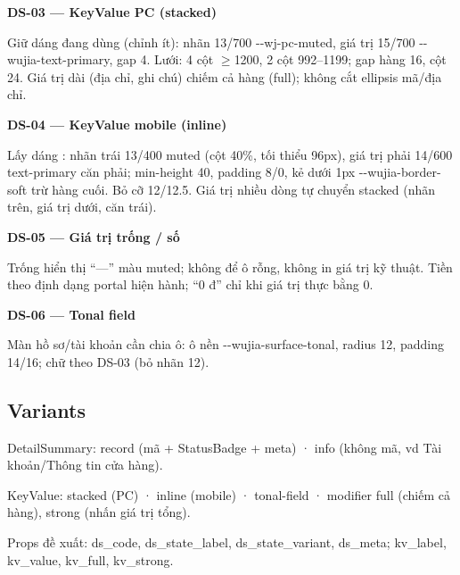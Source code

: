 \documentclass[11pt,a4paper]{report}
\begin{document}
\par\smallskip\textbf{DS-03 — KeyValue PC (stacked)}\par
Giữ dáng  đang dùng (chỉnh ít): nhãn 13/\allowbreak{}700 -\kern0pt-\allowbreak{}wj-\allowbreak{}pc-\allowbreak{}muted, giá trị 15/\allowbreak{}700 -\kern0pt-\allowbreak{}wujia-\allowbreak{}text-\allowbreak{}primary, gap 4. Lưới: 4 cột \(\geq\)1200, 2 cột 992–1199; gap hàng 16, cột 24. Giá trị dài (địa chỉ, ghi chú) chiếm cả hàng (full); không cắt ellipsis mã/\allowbreak{}địa chỉ.\par

\par\smallskip\textbf{DS-04 — KeyValue mobile (inline)}\par
Lấy dáng : nhãn trái 13/\allowbreak{}400 muted (cột 40\%, tối thiểu 96px), giá trị phải 14/\allowbreak{}600 text-\allowbreak{}primary căn phải; min-\allowbreak{}height 40, padding 8/\allowbreak{}0, kẻ dưới 1px -\kern0pt-\allowbreak{}wujia-\allowbreak{}border-\allowbreak{}soft trừ hàng cuối. Bỏ cỡ 12/\allowbreak{}12.5. Giá trị nhiều dòng tự chuyển stacked (nhãn trên, giá trị dưới, căn trái).\par

\par\smallskip\textbf{DS-05 — Giá trị trống / số}\par
Trống hiển thị “—” màu muted; không để ô rỗng, không in giá trị kỹ thuật. Tiền theo định dạng portal hiện hành; “0 đ” chỉ khi giá trị thực bằng 0.\par

\par\smallskip\textbf{DS-06 — Tonal field}\par
Màn hồ sơ/\allowbreak{}tài khoản cần chia ô: ô nền -\kern0pt-\allowbreak{}wujia-\allowbreak{}surface-\allowbreak{}tonal, radius 12, padding 14/\allowbreak{}16; chữ theo DS-03 (bỏ nhãn 12).\par
\subsection*{Variants}
DetailSummary: record (mã + StatusBadge + meta) · info (không mã, vd Tài khoản/\allowbreak{}Thông tin cửa hàng).\par
KeyValue: stacked (PC) · inline (mobile) · tonal-\allowbreak{}field · modifier full (chiếm cả hàng), strong (nhấn giá trị tổng).\par
Props đề xuất: ds\_code, ds\_state\_label, ds\_state\_variant, ds\_meta; kv\_label, kv\_value, kv\_full, kv\_strong.\par
\end{document}

